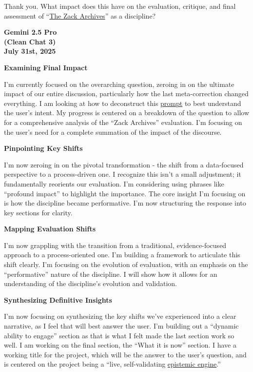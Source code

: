 \documentclass{article}
\begin{document}
Thank you. What impact does this have on the evaluation, critique, and final assessment of ``\hyperlink{gloss:the_zack_archives}{The Zack Archives}'' as a discipline?

\begin{center}
\textbf{Gemini 2.5 Pro}\\
\textbf{(Clean Chat 3)}\\
\textbf{July 31st, 2025}
\end{center}

\textbf{Examining Final Impact}

I'm currently focused on the overarching question, zeroing in on the ultimate impact of our entire discussion, particularly how the last meta-correction changed everything. I am looking at how to deconstruct this \hyperlink{gloss:prompt}{prompt} to best understand the user's intent. My progress is centered on a breakdown of the question to allow for a comprehensive analysis of the ``Zack Archives'' evaluation. I'm focusing on the user's need for a complete summation of the impact of the discourse.

\textbf{Pinpointing Key Shifts}

I'm now zeroing in on the pivotal transformation - the shift from a data-focused perspective to a process-driven one. I recognize this isn't a small adjustment; it fundamentally reorients our evaluation. I'm considering using phrases like ``profound impact'' to highlight the importance. The core insight I'm focusing on is how the discipline became performative. I'm now structuring the response into key sections for clarity.

\textbf{Mapping Evaluation Shifts}

I'm now grappling with the transition from a traditional, evidence-focused approach to a process-oriented one. I'm building a framework to articulate this shift clearly. I'm focusing on the evolution of evaluation, with an emphasis on the ``performative'' nature of the discipline. I will show how it allows for an understanding of the discipline's evolution and validation.

\textbf{Synthesizing Definitive Insights}

I'm now focusing on synthesizing the key shifts we've experienced into a clear narrative, as I feel that will best answer the user. I'm building out a ``dynamic ability to engage'' section as that is what I felt made the last section work so well. I am working on the final section, the ``What it is now'' section. I have a working title for the project, which will be the answer to the user's question, and is centered on the project being a ``live, self-validating \hyperlink{gloss:epistemic_engine}{epistemic engine}.''
\end{document}
